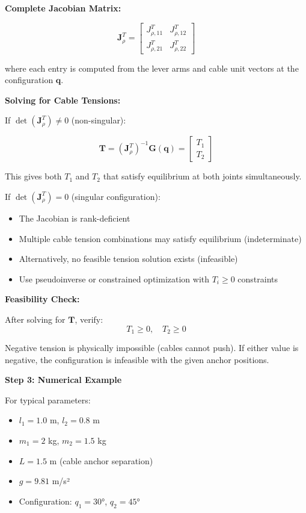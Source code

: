 \textbf{Complete Jacobian Matrix:}

$$\mathbf{J}_{\rho}^T = \begin{bmatrix} J_{\rho,11}^T & J_{\rho,12}^T \\ J_{\rho,21}^T & J_{\rho,22}^T \end{bmatrix}$$

where each entry is computed from the lever arms and cable unit vectors at the configuration $\mathbf{q}$.

\textbf{Solving for Cable Tensions:}

If $\det(\mathbf{J}_{\rho}^T) \neq 0$ (non-singular):

\begin{equation}
\mathbf{T} = (\mathbf{J}_{\rho}^T)^{-1} \mathbf{G}(\mathbf{q}) = \begin{bmatrix} T_1 \\ T_2 \end{bmatrix}
\end{equation}

This gives both $T_1$ and $T_2$ that satisfy equilibrium at both joints simultaneously.

If $\det(\mathbf{J}_{\rho}^T) = 0$ (singular configuration):
\begin{itemize}
    \item The Jacobian is rank-deficient
    \item Multiple cable tension combinations may satisfy equilibrium (indeterminate)
    \item Alternatively, no feasible tension solution exists (infeasible)
    \item Use pseudoinverse or constrained optimization with $T_i \geq 0$ constraints
\end{itemize}

\textbf{Feasibility Check:}

After solving for $\mathbf{T}$, verify:
$$T_1 \geq 0, \quad T_2 \geq 0$$

Negative tension is physically impossible (cables cannot push). If either value is negative, the configuration is infeasible with the given anchor positions.

\textbf{Step 3: Numerical Example}

For typical parameters:
\begin{itemize}
    \item $l_1 = 1.0$ m, $l_2 = 0.8$ m
    \item $m_1 = 2$ kg, $m_2 = 1.5$ kg
    \item $L = 1.5$ m (cable anchor separation)
    \item $g = 9.81$ m/s²
    \item Configuration: $q_1 = 30°$, $q_2 = 45°$
\end{itemize}

